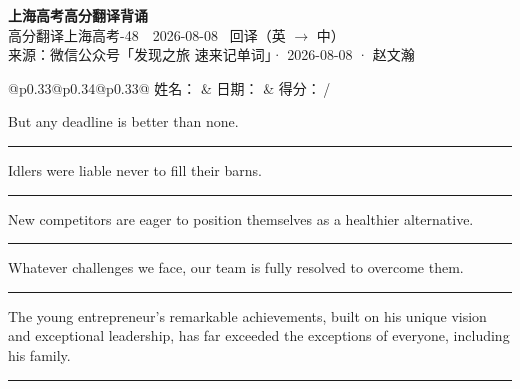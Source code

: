 \documentclass[11pt,a4paper]{article}
\newcommand{\num}[1]{\makebox[1.9em][r]{#1.}\hspace{0.3em}}
\newcommand{\wline}{\noindent\rule{\linewidth}{0.4pt}}
\begin{document}
\pagestyle{plain}
\begin{center}
{\LARGE\bfseries 上海高考高分翻译背诵 }\\[0.25em]
{\large 高分翻译上海高考-48　2026-08-08 \quad\ 回译（英 $\to$ 中）}\\[0.35em]
{\footnotesize 来源：微信公众号「发现之旅 速来记单词」· 2026-08-08 · 赵文瀚}
\end{center}

\vspace{0.4em}
\noindent\begin{tabular}{@{}p{0.33\textwidth}@{}p{0.34\textwidth}@{}p{0.33\textwidth}@{}}
姓名：\underline{\hspace{2.0cm}} & 日期：\underline{\hspace{2.0cm}} & 得分：\underline{\hspace{1.4cm}}\,/ \\
\end{tabular}

\vspace{0.5em}

\vspace{0.8em}
\num{1}But any deadline is better than none.

\vspace{0.25em}

\wline

\num{2}Idlers were liable never to fill their barns.

\vspace{0.25em}

\wline

\num{3}New competitors are eager to position themselves as a healthier alternative.

\vspace{0.25em}

\wline

\num{4}Whatever challenges we face, our team is fully resolved to overcome them.

\vspace{0.25em}

\wline

\num{5}The young entrepreneur’s remarkable achievements, built on his unique vision and exceptional leadership, has far exceeded the exceptions of everyone, including his family.

\vspace{0.25em}

\wline
\end{document}
